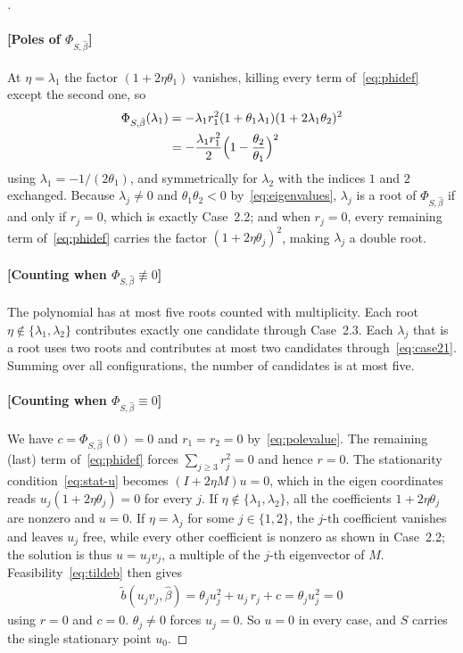 \documentclass[11pt]{article}
\begin{document}
\begin{proof}[]
\paragraph{[Poles of $\Phi_{S,\hat\beta}$]} At $\eta = \lambda_1$ the factor $(1+2\eta\theta_1)$ vanishes, killing every term of~\eqref{eq:phidef} except the second one, so
\begin{align}
    \Phi_{S,\hat\beta}(\lambda_1) &= -\lambda_1 {r}_1^2 (1+\theta_1\lambda_1)(1+2\lambda_1\theta_2)^2 \notag\\
    &= -\frac{\lambda_1 {r}_1^2}{2}\Big(1 - \frac{\theta_2}{\theta_1}\Big)^2 \label{eq:polevalue}
\end{align}
using $\lambda_1 = -1/(2\theta_1)$, and symmetrically for $\lambda_2$ with the indices $1$ and $2$ exchanged. Because $\lambda_j{\neq}0$ and $\theta_1\theta_2 < 0$ by~\eqref{eq:eigenvalues}, $\lambda_j$ is a root of $\Phi_{S,\hat\beta}$ if and only if ${r}_j = 0$, which is exactly Case~2.2; and when ${r}_j = 0$, every remaining term of~\eqref{eq:phidef} carries the factor $(1+2\eta\theta_j)^2$, making $\lambda_j$ a double root.

\paragraph{[Counting when $\Phi_{S,\hat\beta} \not\equiv 0$]} The polynomial has at most five roots counted with multiplicity. Each root $\eta \notin \{\lambda_1,\lambda_2\}$ contributes exactly one candidate through Case~2.3. Each $\lambda_j$ that is a root uses two roots and contributes at most two candidates through~\eqref{eq:case21}. Summing over all configurations, the number of candidates is at most five.

\paragraph{[Counting when $\Phi_{S,\hat\beta}{\equiv}0$]} We have $c = \Phi_{S,\hat\beta}(0) = 0$ and ${r}_1={r}_2=0$ by~\eqref{eq:polevalue}. The remaining (last) term of~\eqref{eq:phidef} forces $\sum_{j\ge3}{r}_j^2=0$ and hence $r=0$. The stationarity condition~\eqref{eq:stat-u} becomes $(I+2\eta M)u=0$, which in the eigen coordinates reads $u_j(1+2\eta\theta_j) = 0$ for every $j$. If $\eta \notin \{\lambda_1,\lambda_2\}$, all the coefficients $1+2\eta\theta_j$ are nonzero and $u = 0$. If $\eta = \lambda_j$ for some $j \in \{1,2\}$, the $j$-th coefficient vanishes and leaves $u_j$ free, while every other coefficient is nonzero as shown in Case~2.2; the solution is thus $u = u_j v_j$, a multiple of the $j$-th eigenvector of $M$. Feasibility~\eqref{eq:tildeb} then gives
\begin{align}
    \tilde b(u_j v_j, \hat\beta) = \theta_j u_j^2 + u_j\, {r}_j + c = \theta_j u_j^2 = 0
\end{align}
using $r = 0$ and $c = 0$. $\theta_j \neq 0$ forces $u_j = 0$. So $u = 0$ in every case, and $S$ carries the single stationary point $u_0$.


\end{proof}
\end{document}
